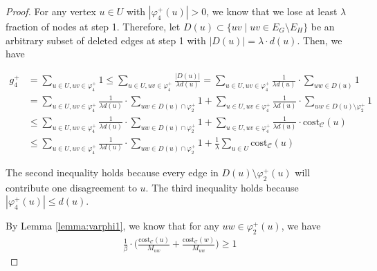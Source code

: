 \documentclass[11pt]{article}
\newcommand{\cost}{\mathrm{cost}}
\newcommand{\calC}{{\mathcal{C}}}
\begin{document}
\begin{CJK*}{UTF8}{gbsn}
\begin{proof}
For any vertex $u \in U$ with $|\varphi^+_4(u)| > 0$, we know that we lose at least $\lambda$ fraction of nodes at step 1. Therefore, let $D(u) \subset \{uv \mid uv \in E_G \setminus E_H \}$ be an arbitrary subset of deleted edges at step 1 with $|D(u)| = \lambda \cdot d(u)$. Then, we have 

\begin{align*}
    g^+_4 &= \sum_{u \in U, uv \in \varphi^+_4} 1 \leq \sum_{u \in U, uv \in \varphi^+_4} \frac{|D(u)|}{\lambda d(u)}
    = \sum_{u \in U, uv \in \varphi^+_4} \frac{1}{\lambda d(u)} \cdot \sum_{uw \in D(u)} 1 \\
    &= \sum_{u \in U, uv \in \varphi^+_4} \frac{1}{\lambda d(u)} \cdot \sum_{uw \in D(u) \cap \varphi^+_2} 1 + \sum_{u \in U, uv \in \varphi^+_4} \frac{1}{\lambda d(u)} \cdot \sum_{uw \in D(u) \setminus \varphi^+_2} 1 \\
    &\leq \sum_{u \in U, uv \in \varphi^+_4} \frac{1}{\lambda d(u)} \cdot \sum_{uw \in D(u) \cap \varphi^+_2} 1 + \sum_{u \in U, uv \in \varphi^+_4} \frac{1}{\lambda d(u)} \cdot \cost_{\calC}(u) \\
    &\leq \sum_{u \in U, uv \in \varphi^+_4} \frac{1}{\lambda d(u)} \cdot \sum_{uw \in D(u) \cap \varphi^+_2} 1 + \frac{1}{\lambda} \sum_{u \in U} \cost_{\calC}(u)
\end{align*}

The second inequality holds because every edge in $D(u) \setminus \varphi^+_2(u)$ will contribute one disagreement to $u$. The third inequality holds because $|\varphi^+_4(u)| \leq d(u)$.


By Lemma \ref{lemma:varphi1}, we know that for any $uw \in \varphi^+_2(u)$, we have 
\begin{align*}
    \frac{1}{\beta} \cdot \big( \frac{\cost_{\mathcal{C}}(u)}{M_{uw}}+ \frac{\cost_{\mathcal{C}}(w)}{M_{uw}}\big) \geq 1
\end{align*}


\end{proof}
\end{CJK*}
\end{document}
